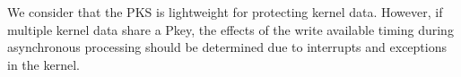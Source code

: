 %

%

%



We consider that the PKS is lightweight for protecting kernel data.
%
However, if multiple kernel data share a Pkey, 
the effects of the write available timing during asynchronous processing should
be determined due to interrupts and exceptions in the kernel. 
% 


